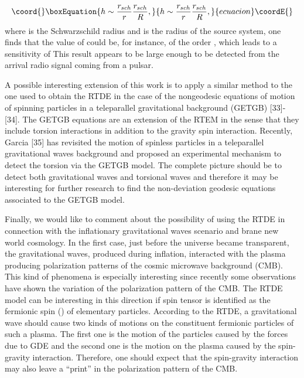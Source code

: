 \documentclass[a4paper,12pt]{article}
\begin{document}
\begin{equation}\coord{}\boxEquation{
h\sim \frac{r_{sch}}{r}\frac{r_{sch}}{R},  \label{64}
}{
h\sim \frac{r_{sch}}{r}\frac{r_{sch}}{R},  }{ecuacion}\coordE{}\end{equation}
where \coordHE{} is the Schwarzschild radius and \coordHE{} is the radius of the
source system, one finds that the value of \coordHE{} could be, for instance, of
the order \coordHE{}, which leads to a sensitivity of \coordHE{}
This result appears to be large enough to be detected from the arrival radio
signal coming from a pulsar.

A possible interesting extension of this work is to apply a similar method
to the one used to obtain the RTDE in the case of the nongeodesic equations
of motion of spinning particles in a teleparallel gravitational background
(GETGB) [33]-[34]. The GETGB equations are an extension of the RTEM in the
sense that they include torsion interactions in addition to the gravity spin
interaction. Recently, Garcia [35] has revisited the motion of spinless
particles in a teleparallel gravitational waves background and proposed an
experimental mechanism to detect the torsion via the GETGB model. The
complete picture should be to detect both gravitational waves and torsional
waves and therefore it may be interesting for further research to find the
non-deviation geodesic equations associated to the GETGB model.

Finally, we would like to comment about the possibility of using the RTDE in
connection with the inflationary gravitational waves scenario and brane new
world cosmology. In the first case, just before the universe became
transparent, the gravitational waves, produced during inflation, interacted
with the plasma producing polarization patterns of the cosmic microwave
background (CMB). This kind of phenomena is especially interesting since
recently some observations have shown the variation of the polarization
pattern of the CMB. The RTDE model can be interesting in this direction if
spin tensor \coordHE{} is identified as the fermionic spin (\coordHE{}) of elementary particles.
According to the RTDE, a gravitational wave should cause two kinds of
motions on the constituent fermionic particles of such a plasma. The first
one is the motion of the particles caused by the forces due to GDE and the
second one is the motion on the plasma caused by the spin-gravity
interaction. Therefore, one should expect that the spin-gravity interaction
may also leave a ``print'' in the polarization pattern of the CMB.
\end{document}
